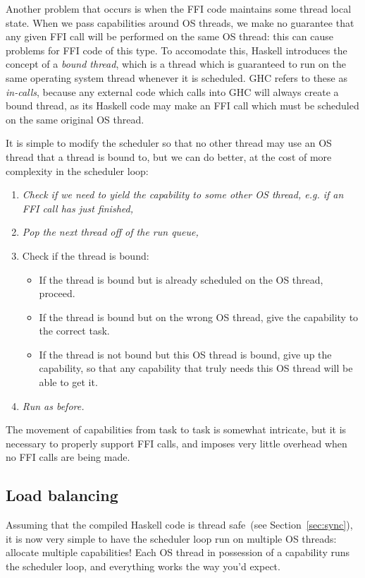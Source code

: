 Another problem that occurs is when the FFI code maintains some thread
local state.  When we pass capabilities around OS threads, we make no
guarantee that any given FFI call will be performed on the same OS
thread: this can cause problems for FFI code of this type.  To
accomodate this, Haskell introduces the concept of a \emph{bound
thread}, which is a thread which is guaranteed to run on the same
operating system thread whenever it is scheduled.  GHC refers to these
as \emph{in-calls}, because any external code which calls into GHC will
always create a bound thread, as its Haskell code may make an FFI call
which must be scheduled on the same original OS thread.

It is simple to modify the scheduler so that no other thread may use
an OS thread that a thread is bound to, but we can do better, at the
cost of more complexity in the scheduler loop:

\begin{enumerate}
    \item \emph{Check if we need to yield the capability to some other OS thread, e.g. if an FFI call has just finished,}
    \item \emph{Pop the next thread off of the run queue,}
    \item Check if the thread is bound:
        \begin{itemize}
            \item If the thread is bound but is already scheduled on the OS thread, proceed.
            \item If the thread is bound but on the wrong OS thread, give the capability to the correct task.
            \item If the thread is not bound but this OS thread is bound, give up the capability, so that any capability that truly needs this OS thread will be able to get it.
        \end{itemize}
    \item \emph{Run as before.}
\end{enumerate}

The movement of capabilities from task to task is somewhat intricate,
but it is necessary to properly support FFI calls, and imposes very
little overhead when no FFI calls are being made.

\subsection{Load balancing}

Assuming that the compiled Haskell code is thread safe~(see Section~\ref{sec:sync}), it is now
very simple to have the scheduler loop run on multiple OS threads:
allocate multiple capabilities!  Each OS thread in possession of a capability
runs the scheduler loop, and everything works the way you'd expect.

